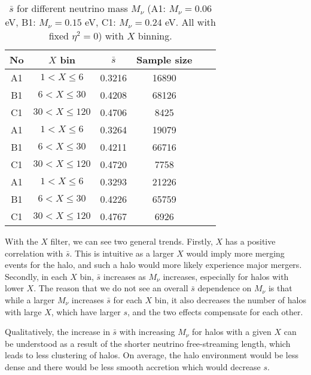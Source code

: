 \begin{table}[!hbt]
		\begin{center}
\begin{tabular}{|c|c|c|c|c|c|}
			\hline 
			No & $X$ bin & $\bar s$ & Sample size \\
			\hline \hline
			A1 & $1<X\le6$ & 0.3216 & 16890  \\
			B1& $6<X\le30$ & 0.4208 & 68126  \\
			C1 & $30<X\le120$ & 0.4706 & 8425  \\
			\hline
			A1 & $1<X\le6$ & 0.3264 & 19079  \\
			B1 & $6<X\le30$ & 0.4211 & 66716  \\
			C1 & $30<X\le120$ & 0.4720 & 7758  \\
			\hline
			A1 & $1<X\le6$ & 0.3293 & 21226  \\
			B1 & $6<X\le30$ & 0.4226 & 65759  \\
			C1 & $30<X\le120$ & 0.4767 & 6926  \\
			\hline
		\end{tabular}
		\caption{$\bar s$ for different neutrino mass $M_\nu$ (A1: $M_\nu = 0.06$ eV, B1: $M_\nu = 0.15$ eV, C1: $M_\nu = 0.24$ eV. All with fixed $\eta^2 = 0$) with $X$ binning.}
		\end{center}
\end{table}

With the $X$ filter, we can see two general trends. Firstly, $X$ has a positive correlation with $\bar s$. This is intuitive as a larger $X$ would imply more merging events for the halo, and such a halo would more likely experience major mergers. Secondly, in each $X$ bin, $\bar s$ increases as $M_\nu$ increases, especially for halos with lower $X$. The reason that we do not see an overall $\bar s$ dependence on $M_\nu$ is that while a larger $M_\nu$ increases $\bar s$ for each $X$ bin, it also decreases the number of halos with large $X$, which have larger $s$, and the two effects compensate for each other.

Qualitatively, the increase in $\bar s$ with increasing $M_\nu$ for halos with a given $X$ can be understood as a result of the shorter neutrino free-streaming length, which leads to less clustering of halos. On average, the halo environment would be less dense and there would be less smooth accretion which would decrease $s$.



